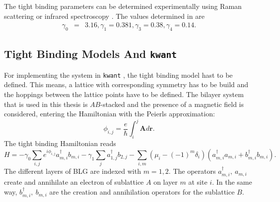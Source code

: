 The tight binding parameters can be determined experimentally using Raman scattering \cite{Malard2007} or infrared spectroscopy \cite{Kuzmenko2009}. The values determined in \cite{Kuzmenko2009} are
\begin{eqnarray}
\gamma_0 &=& 3.16,
\gamma_1 = 0.381, 
\gamma_3 = 0.38,
\gamma_4 = 0.14.
\end{eqnarray}

\subsection{Tight Binding Models And \texttt{kwant}}
For implementing the system in \texttt{kwant} , the tight binding model hast to be defined. This means,  a lattice with corresponding symmetry has to be build and the hoppings between the lattice points have to be defined. The bilayer system that is used in this thesis is $AB$-stacked and the presence of a magnetic field is considered, entering the Hamiltonian with the Peierls approximation:
\begin{equation}
\phi_{i, j} = \frac{e}{\hbar} \int_i^j \mathbf{A} d\mathbf{r}.
\end{equation}
The tight binding Hamiltonian reads
\begin{equation}
H = - \gamma_0 \sum_{i, j} e^{i \phi_{i, j }} a^\dagger_{m, i} b_{m, i} - \gamma_1 \sum_j a_{1, j}^\dagger b_{2, j} - \sum_{i, m} \left( \mu_i - (-1)^m \delta_i\right) \left(a^\dagger_{m, i} a_{m, i} + b^\dagger_{m, i} b_{m, i} \right).
\end{equation}
The different layers of BLG are indexed with $m = 1, 2$. The operators $a^\dagger_{m, i},\ a_{m, i}$ create and annihilate an electron of sublattice $A$ on layer $m$ at site $i$. In the same way, $b^\dagger_{m, i},\ b_{m, i}$ are the creation and annihilation operators for the sublattice $B$.
